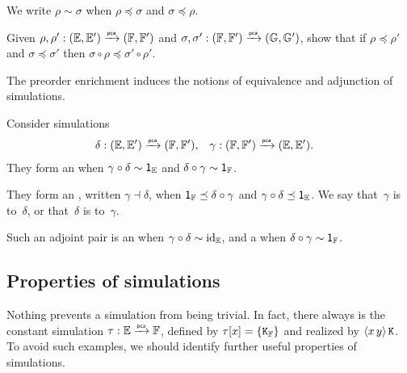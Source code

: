 We write $\rho \sim \sigma$ when $\rho \preceq \sigma$ and $\sigma \preceq \rho$.

\begin{exercise}
  Given $\rho, \rho' : (\EE, \subEE) \pcato (\FF, \subFF)$ and $\sigma, \sigma' : (\FF, \subFF) \pcato (\GG, \subGG)$, show that if $\rho \preceq \rho'$ and $\sigma \preceq \sigma'$ then $\sigma \circ \rho \preceq \sigma' \circ \rho'$.
\end{exercise}

The preorder enrichment induces the notions of equivalence and adjunction of simulations.

\goodbreak

\begin{definition}%
  Consider simulations
  \begin{align*}
    \delta &: (\EE, \subEE) \pcato (\FF, \subFF),
    &
    \gamma &: (\FF, \subFF) \pcato (\EE, \subEE).
  \end{align*}
  They form an  when $\gamma \circ \delta \sim \one_\EE$ and $\delta \circ \gamma \sim \one_\FF$.

  They form an , written $\gamma \dashv \delta$, when
  $\one_{\FF} \preceq \delta \circ \gamma$ and $\gamma \circ
  \delta \preceq \one_{\EE}$. We say that~$\gamma$ is  to~$\delta$, or that~$\delta$ is 
  to~$\gamma$.

  Such an adjoint pair is an  when $\gamma \circ \delta \sim \id[\EE]$, and a
   when $\delta \circ \gamma \sim \one_\FF$.
\end{definition}

\subsection{Properties of simulations}
\label{sec:prop-simul}

Nothing prevents a simulation from being trivial. In fact, there always is the constant simulation $\tau : \EE \pcato \FF$, defined by $\tau[x] = \set{\combK_{\FF}}$ and realized by $\pcalam{x\,y} \combK$. To avoid such examples, we should identify further useful properties of simulations.

